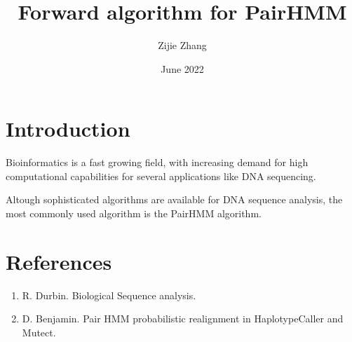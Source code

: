 \documentclass{article}
\title{Forward algorithm for PairHMM}
\author{Zijie Zhang}
\date{June 2022}
\begin{document}
\maketitle

\tableofcontents

\newpage

\section{Introduction}

Bioinformatics is a fast growing field, with increasing demand for high computational capabilities for several applications like DNA sequencing.

Altough sophisticated algorithms are available for DNA sequence analysis, the most commonly used algorithm is the PairHMM algorithm.


\section{References}

\begin{enumerate}
    \item R. Durbin. Biological Sequence analysis.
    \item D. Benjamin. Pair HMM probabilistic realignment in HaplotypeCaller and Mutect.
\end{enumerate}
\end{document}
